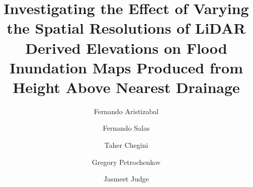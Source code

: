 \documentclass[preprint,review,12pt]{dependencies/elsarticle}
\begin{document}
%
\begin{frontmatter}
%
%


\title{Investigating the Effect of Varying the Spatial Resolutions of LiDAR Derived Elevations on Flood Inundation Maps Produced from Height Above Nearest Drainage}


\author[lynk,nwc,uf]{Fernando Aristizabal}

\author[nwc]{Fernando Salas}
\author[uh]{Taher Chegini}
\author[usgs]{Gregory Petrochenkov}
\author[uf]{Jasmeet Judge}
%
%


\end{frontmatter}
\end{document}
